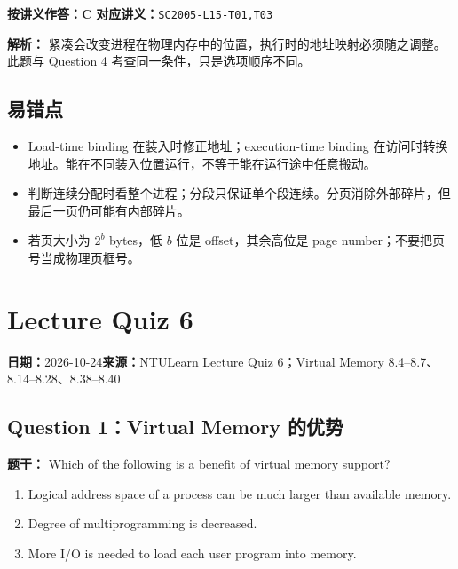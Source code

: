 \documentclass[11pt,a4paper,fontset=fandol]{ctexart}
\renewcommand{\exercisequestion}[2]{%
  \Needspace{5\baselineskip}%
  \subsection{#2}\label{exercise:#1}%
}
\renewcommand{\exercisemeta}[5]{%
  {\small\textbf{日期：}#2\quad\textbf{来源：}#3\par}%
}
\renewenvironment{checkedsolution}
  {\par\nopagebreak[4]\textbf{解析：}\ignorespaces}
  {\par}
\begin{document}
\textbf{按讲义作答：C}\qquad
\textbf{对应讲义：}\texttt{SC2005-L15-T01,T03}

\begin{checkedsolution}
紧凑会改变进程在物理内存中的位置，执行时的地址映射必须随之调整。此题与 Question 4 考查同一条件，只是选项顺序不同。
\end{checkedsolution}

\subsection{易错点}

\begin{itemize}
  \item Load-time binding 在装入时修正地址；execution-time binding 在访问时转换地址。能在不同装入位置运行，不等于能在运行途中任意搬动。
  \item 判断连续分配时看整个进程；分段只保证单个段连续。分页消除外部碎片，但最后一页仍可能有内部碎片。
  \item 若页大小为 $2^b$ bytes，低 $b$ 位是 offset，其余高位是 page number；不要把页号当成物理页框号。
\end{itemize}

\section{Lecture Quiz 6}
\label{homework:SC2005-HW06}

\exercisemeta
  {SC2005-HW06}
  {2026-10-24}
  {NTULearn Lecture Quiz 6；Virtual Memory 8.4--8.7、8.14--8.28、8.38--8.40}
  {五道题已完成，并根据讲义与平台反馈核对}
  {是（2026-10-24）}

\exercisequestion{SC2005-HW06-Q01}{Question 1：Virtual Memory 的优势}

\textbf{题干：} Which of the following is a benefit of virtual memory support?

\begin{enumerate}[label=\Alph*.,leftmargin=2.4em]
  \item Logical address space of a process can be much larger than available memory.
  \item Degree of multiprogramming is decreased.
  \item More I/O is needed to load each user program into memory.
\end{enumerate}
\end{document}
